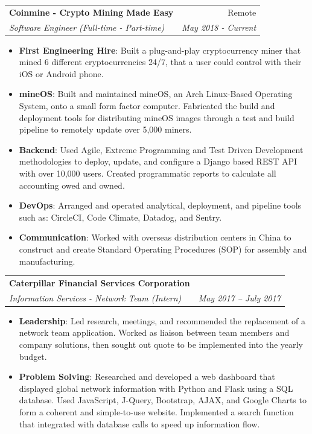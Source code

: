 \documentclass[a4paper,20pt]{article}
\makeatletter
\newcommand{\resumeItem}[2]{
  \item\small{
    \textbf{#1}{: #2 \vspace{-2pt}}
  }
}
\newcommand{\resumeSubheading}[4]{
  \vspace{-1pt}\item
    \begin{tabular*}{0.97\textwidth}{l@{\extracolsep{\fill}}r}
      \textbf{#1} & #2 \\
      \textit{#3} & \textit{#4} \\
    \end{tabular*}\vspace{-5pt}
}
\newcommand{\resumeItemListStart}{\begin{itemize}}
\newcommand{\resumeItemListEnd}{\end{itemize}\vspace{-5pt}}
\makeatother
\begin{document}
    \resumeSubheading
		{Coinmine - Crypto Mining Made Easy}{Remote}
		{Software Engineer (Full-time - Part-time)}{May 2018 - Current}
		\resumeItemListStart
        \resumeItem{First Engineering Hire}
        {Built a plug-and-play cryptocurrency miner that mined 6 different cryptocurrencies 24/7, that a user could control with their iOS or Android phone.}
        \resumeItem{mineOS}
        {Built and maintained mineOS, an Arch Linux-Based Operating System, onto a small form factor computer. Fabricated the build and deployment tools for distributing mineOS images through a test and build pipeline to remotely update over 5,000 miners.}
        \resumeItem{Backend}
        {Used Agile, Extreme Programming and Test Driven Development methodologies to deploy, update, and configure a Django based REST API with over 10,000 users. Created programmatic reports to calculate all accounting owed and owned.}
        \resumeItem{DevOps}
        {Arranged and operated analytical, deployment, and pipeline tools such as: CircleCI, Code Climate, Datadog, and Sentry.}
        \resumeItem{Communication}
        {Worked with overseas distribution centers in China to construct and create Standard Operating Procedures (SOP) for assembly and manufacturing.}
		\resumeItemListEnd
\vspace{-3pt}

    \resumeSubheading
		{Caterpillar Financial Services Corporation}{}
		{Information Services - Network Team (Intern)}{May 2017 – July 2017}
		\resumeItemListStart
        \resumeItem{Leadership}
        {Led research, meetings, and recommended the replacement of a network team application. Worked as liaison between team members and company solutions, then sought out quote to be implemented into the yearly budget.}
        \resumeItem{Problem Solving}
        {Researched and developed a web dashboard that displayed global network information with Python and Flask using a SQL database. Used JavaScript, J-Query, Bootstrap, AJAX, and Google Charts to form a coherent and simple-to-use website. Implemented a search function that integrated with database calls to speed up information flow.}
		\resumeItemListEnd
\vspace{-3pt}
\end{document}
